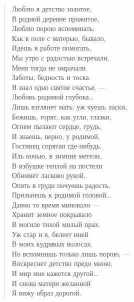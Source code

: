 \begin{verse}
\begin{altverse}
    Люблю я детство золотое,\\
В родной деревне прожитое,\\
    Люблю порою вспоминать:\\
Как в поле с матерью, бывало,\\
    Идешь в работе помогать,\\
Мы утро с радостью встречали,\\
Меня тогда не омрачали\\
    Заботы, бедность и тоска.\\
Я знал одно святое счастье, ---\\
    Любовь родимой глубока\ldots\\
Лишь взглянет мать: уж чуешь ласки,\\
Бежишь, горят, как угли, глазки,\\
    Огнем пылают сердце, грудь,\\
И знаешь, верно, у родимой, \\
    Гостинец спрятан где-нибудь.\\
Иль ночью, в зимние метели,\\
В избушке теплой на постели\\
    Обнимет ласково рукой,\\
Опять в груди почуешь радость, \\
    Прильнешь к родимой головой\ldots\\
Давно то время миновало ---\\
Хранит земное покрывало\\
    В могиле тихой милый прах.\\
Уж стар и я, белеет иней\\
    В моих кудрявых волосах.\\
Но вспомнишь только лишь порою, ---\\
Воскреснет детство предо мною,\\
    И мир мне кажется другой\ldots\\
И снова матери желанной\\
Я вижу образ дорогой.
\end{altverse}
\end{verse}

